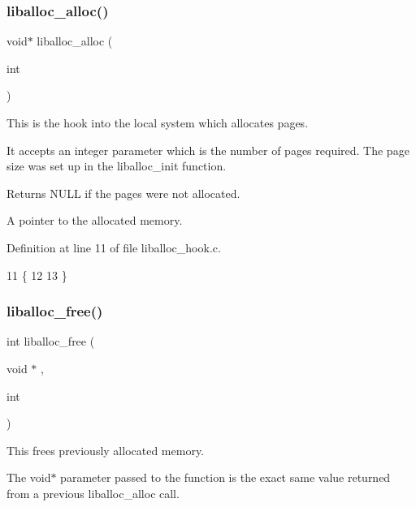 \subsubsection{\texorpdfstring{liballoc\+\_\+alloc()}{liballoc\_alloc()}}
{\footnotesize\ttfamily void$\ast$ liballoc\+\_\+alloc (\begin{DoxyParamCaption}\item[{int}]{ }\end{DoxyParamCaption})}



This is the hook into the local system which allocates pages. 

It accepts an integer parameter which is the number of pages required. The page size was set up in the liballoc\+\_\+init function.

\begin{DoxyReturn}{Returns}
N\+U\+LL if the pages were not allocated. 

A pointer to the allocated memory. 
\end{DoxyReturn}


Definition at line 11 of file liballoc\+\_\+hook.\+c.


\begin{DoxyCode}
11                                 \{
12 
13 \}
\end{DoxyCode}
\mbox{\label{a00029_aee2dc12f19409f4a76b2aa36f5ab1316_aee2dc12f19409f4a76b2aa36f5ab1316}} 
\subsubsection{\texorpdfstring{liballoc\+\_\+free()}{liballoc\_free()}}
{\footnotesize\ttfamily int liballoc\+\_\+free (\begin{DoxyParamCaption}\item[{void $\ast$}]{,  }\item[{int}]{ }\end{DoxyParamCaption})}



This frees previously allocated memory. 

The void$\ast$ parameter passed to the function is the exact same value returned from a previous liballoc\+\_\+alloc call.

